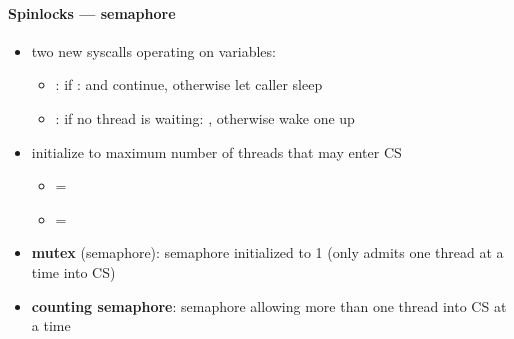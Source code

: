 \paragraph{Spinlocks --- semaphore}
\begin{itemize}
  \item two new syscalls operating on  variables:
  \begin{itemize}
    \item {}: if :  and continue, otherwise let caller sleep
    \item {}: if no thread is waiting: , otherwise wake one up
  \end{itemize}
  \item initialize  to maximum number of threads that may enter CS
  \begin{itemize}
    \item {} = 
    \item {} = 
  \end{itemize}
  \item \textbf{mutex} (semaphore): semaphore initialized to 1 (only admits one thread at a time into CS)
  \item \textbf{counting semaphore}: semaphore allowing more than one thread into CS at a time
\end{itemize}

